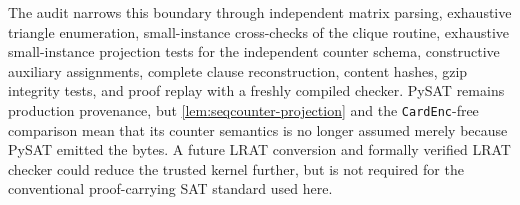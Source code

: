 The audit narrows this boundary through independent matrix parsing, exhaustive
triangle enumeration, small-instance cross-checks of the clique routine,
exhaustive small-instance projection tests for the independent counter schema,
constructive auxiliary assignments, complete clause reconstruction, content
hashes, gzip integrity tests, and proof replay with a freshly compiled checker.
PySAT remains production provenance, but
\cref{lem:seqcounter-projection} and the \texttt{CardEnc}-free comparison mean
that its counter semantics is no longer assumed merely because PySAT emitted
the bytes.  A future LRAT conversion and formally verified LRAT checker could
reduce the trusted kernel further, but is not required for the conventional
proof-carrying SAT standard used here.
